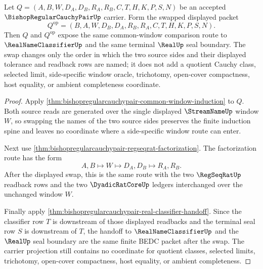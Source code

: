 \begin{theorem}
\label{thm:bishopregularcauchypair-symmetric-classifier-route}
Let $Q=(A,B,W,D_A,D_B,R_A,R_B,C,T,H,K,P,S,N)$ be an accepted $\BishopRegularCauchyPairUp$ carrier. Form the swapped displayed packet
$$
Q^{\mathrm{op}}=(B,A,W,D_B,D_A,R_B,R_A,C,T,H,K,P,S,N).
$$
Then $Q$ and $Q^{\mathrm{op}}$ expose the same common-window comparison route to $\RealNameClassifierUp$ and the same terminal $\RealUp$ seal boundary. The swap changes only the order in which the two source sides and their displayed tolerance and readback rows are named; it does not add a quotient Cauchy class, selected limit, side-specific window oracle, trichotomy, open-cover compactness, host equality, or ambient completeness coordinate.
\end{theorem}
\begin{proof}
Apply \autoref{thm:bishopregularcauchypair-common-window-induction} to $Q$. Both source reads are generated over the single displayed $\StreamNameUp$ window $W$, so swapping the names of the two source sides preserves the finite induction spine and leaves no coordinate where a side-specific window route can enter.

Next use \autoref{thm:bishopregularcauchypair-regseqrat-factorization}. The factorization route has the form
$$
A,B \longmapsto W \longmapsto D_A,D_B \longmapsto R_A,R_B .
$$
After the displayed swap, this is the same route with the two $\RegSeqRatUp$ readback rows and the two $\DyadicRatCoreUp$ ledgers interchanged over the unchanged window $W$.

Finally apply \autoref{thm:bishopregularcauchypair-real-classifier-handoff}. Since the classifier row $T$ is downstream of those displayed readbacks and the terminal seal row $S$ is downstream of $T$, the handoff to $\RealNameClassifierUp$ and the $\RealUp$ seal boundary are the same finite BEDC packet after the swap. The carrier projection still contains no coordinate for quotient classes, selected limits, trichotomy, open-cover compactness, host equality, or ambient completeness.
\end{proof}

